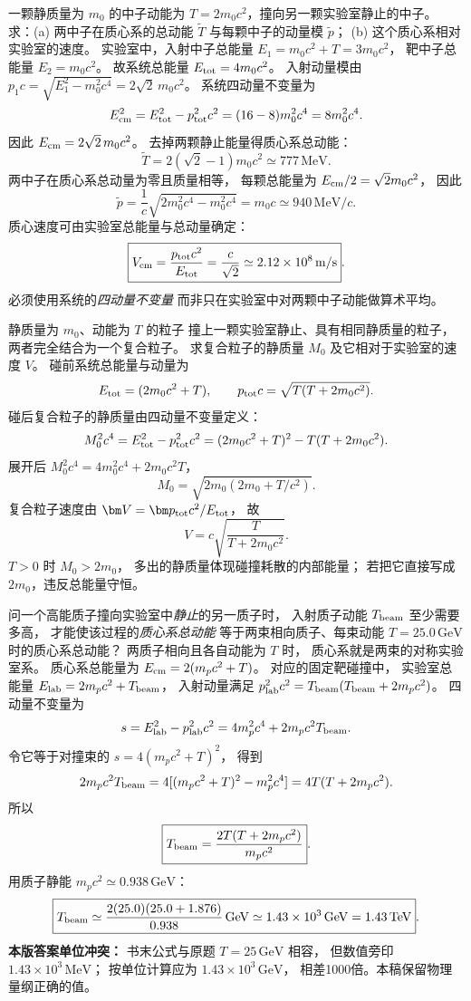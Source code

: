 一颗静质量为 $m_0$ 的中子动能为
$T=2m_0c^2$，撞向另一颗实验室静止的中子。
求：(a) 两中子在质心系的总动能
$\widetilde T$ 与每颗中子的动量模
$\widetilde p$；
(b) 这个质心系相对实验室的速度。
\exsolution
实验室中，入射中子总能量
$E_1=m_0c^2+T=3m_0c^2$，
靶中子总能量 $E_2=m_0c^2$。
故系统总能量
$E_{\rm tot}=4m_0c^2$。
入射动量模由
$p_1c=\sqrt{E_1^2-m_0^2c^4}
=2\sqrt2\,m_0c^2$。
系统四动量不变量为
\[
E_{\rm cm}^2
=E_{\rm tot}^2-p_{\rm tot}^2c^2
=(16-8)m_0^2c^4=8m_0^2c^4.
\]
因此
$E_{\rm cm}=2\sqrt2\,m_0c^2$。
去掉两颗静止能量得质心系总动能：
\[
\boxed{\widetilde T
=2(\sqrt2-1)m_0c^2
\simeq777\,\mathrm{MeV}}.
\]
两中子在质心系总动量为零且质量相等，
每颗总能量为
$E_{\rm cm}/2=\sqrt2 m_0c^2$，
因此
\[
\boxed{\widetilde p=
\frac1c\sqrt{2m_0^2c^4-m_0^2c^4}
=m_0c\simeq940\,\mathrm{MeV}/c}.
\]
质心速度可由实验室总能量与总动量确定：
\[
\boxed{V_{\rm cm}
=\frac{p_{\rm tot}c^2}{E_{\rm tot}}
=\frac{c}{\sqrt2}
\simeq2.12\times10^8\,\mathrm{m/s}}.
\]
\excheck 必须使用系统的\emph{四动量不变量}
而非只在实验室中对两颗中子动能做算术平均。

静质量为 $m_0$、动能为 $T$ 的粒子
撞上一颗实验室静止、具有相同静质量的粒子，
两者完全结合为一个复合粒子。
求复合粒子的静质量 $M_0$
及它相对于实验室的速度 $V$。
\exsolution
碰前系统总能量与动量为
\[
E_{\rm tot}=(2m_0c^2+T),\qquad
p_{\rm tot}c=\sqrt{T(T+2m_0c^2)}.
\]
碰后复合粒子的静质量由四动量不变量定义：
\[
M_0^2c^4=E_{\rm tot}^2-p_{\rm tot}^2c^2
=(2m_0c^2+T)^2-T(T+2m_0c^2).
\]
展开后
$M_0^2c^4=4m_0^2c^4+2m_0c^2T$，
\[
\boxed{M_0=\sqrt{2m_0(2m_0+T/c^2)}}.
\]
复合粒子速度由
$\bm V=\bm p_{\rm tot}c^2/E_{\rm tot}$，
故
\[
\boxed{V=c\sqrt{\frac{T}{T+2m_0c^2}}}.
\]
\excheck $T>0$ 时 $M_0>2m_0$，
多出的静质量体现碰撞耗散的内部能量；
若把它直接写成 $2m_0$，违反总能量守恒。

问一个高能质子撞向实验室中\emph{静止}的另一质子时，
入射质子动能 $T_{\rm beam}$ 至少需要多高，
才能使该过程的\emph{质心系总动能}
等于两束相向质子、每束动能
$T=25.0\,\mathrm{GeV}$ 时的质心系总动能？
\exsolution
两质子相向且各自动能为 $T$ 时，
质心系就是两束的对称实验室系。
质心系总能量为
$E_{\rm cm}=2(m_pc^2+T)$。
对应的固定靶碰撞中，
实验室总能量
$E_{\rm lab}=2m_pc^2+T_{\rm beam}$，
入射动量满足
$p_{\rm lab}^2c^2
=T_{\rm beam}(T_{\rm beam}+2m_pc^2)$。
四动量不变量为
\[
s=E_{\rm lab}^2-p_{\rm lab}^2c^2
=4m_p^2c^4+2m_pc^2T_{\rm beam}.
\]
令它等于对撞束的
$s=4(m_pc^2+T)^2$，
得到
\[
2m_pc^2T_{\rm beam}
=4[(m_pc^2+T)^2-m_p^2c^4]
=4T(T+2m_pc^2).
\]
所以
\[
\boxed{T_{\rm beam}=
\frac{2T(T+2m_pc^2)}{m_pc^2}}.
\]
用质子静能 $m_pc^2\simeq0.938\,\mathrm{GeV}$：
\[
\boxed{T_{\rm beam}
\simeq\frac{2(25.0)(25.0+1.876)}{0.938}
\,\mathrm{GeV}\simeq1.43\times10^3\,\mathrm{GeV}
=1.43\,\mathrm{TeV}}.
\]
\excheck \textbf{本版答案单位冲突：}
书末公式与原题 $T=25\,\mathrm{GeV}$ 相容，
但数值旁印 $1.43\times10^3\,\mathrm{MeV}$；
按单位计算应为
$1.43\times10^3\,\mathrm{GeV}$，
相差1000倍。本稿保留物理量纲正确的值。

